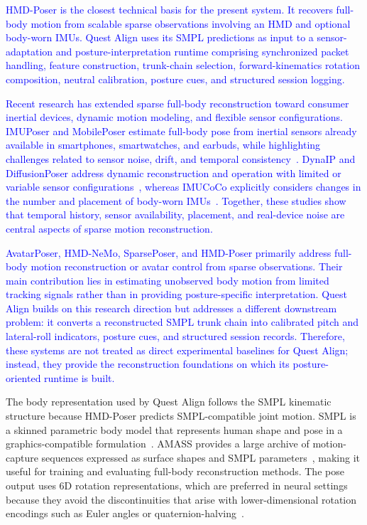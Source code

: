 \documentclass[conference]{IEEEtran}
\newcommand{\CC}[1]{\textcolor{blue}{#1}}
\begin{document}
\CC{HMD-Poser is the closest technical basis for the present system. It recovers full-body
motion from scalable sparse observations involving an HMD and optional body-worn IMUs.
Quest Align uses its SMPL predictions as input to a sensor-adaptation and
posture-interpretation runtime comprising synchronized packet handling, feature construction,
trunk-chain selection, forward-kinematics rotation composition, neutral calibration, posture
cues, and structured session logging.}

\CC{Recent research has extended sparse full-body reconstruction toward
consumer inertial devices, dynamic motion modeling, and flexible sensor
configurations. IMUPoser and MobilePoser estimate full-body pose from inertial
sensors already available in smartphones, smartwatches, and earbuds, while
highlighting challenges related to sensor noise, drift, and temporal
consistency~\cite{imuposer,mobileposer}. DynaIP and DiffusionPoser address
dynamic reconstruction and operation with limited or variable sensor
configurations~\cite{dynaip,diffusionposer}, whereas IMUCoCo explicitly
considers changes in the number and placement of body-worn
IMUs~\cite{imucoco}. Together, these studies show that temporal history,
sensor availability, placement, and real-device noise are central aspects of
sparse motion reconstruction.}

\CC{AvatarPoser, HMD-NeMo, SparsePoser, and HMD-Poser primarily address full-body motion reconstruction or avatar control from sparse observations. Their main contribution lies in estimating unobserved body motion from limited tracking signals rather than in providing posture-specific interpretation. Quest Align builds on this research direction but addresses a different downstream problem: it converts a reconstructed SMPL trunk chain into calibrated pitch and lateral-roll indicators, posture cues, and structured session records. Therefore, these systems are not treated as direct experimental baselines for Quest Align; instead, they provide the reconstruction foundations on which its posture-oriented runtime is built.}

The body representation used by Quest Align follows the SMPL kinematic structure because
HMD-Poser predicts SMPL-compatible joint motion. SMPL is a skinned parametric body model
that represents human shape and pose in a graphics-compatible formulation~\cite{smpl}.
AMASS provides a large archive of motion-capture sequences expressed as surface shapes and
SMPL parameters~\cite{amass}, making it useful for training and evaluating full-body
reconstruction methods. The pose output uses 6D rotation representations, which are
preferred in neural settings because they avoid the discontinuities that arise with
lower-dimensional rotation encodings such as Euler angles or
quaternion-halving~\cite{zhou6d}.
\end{document}

